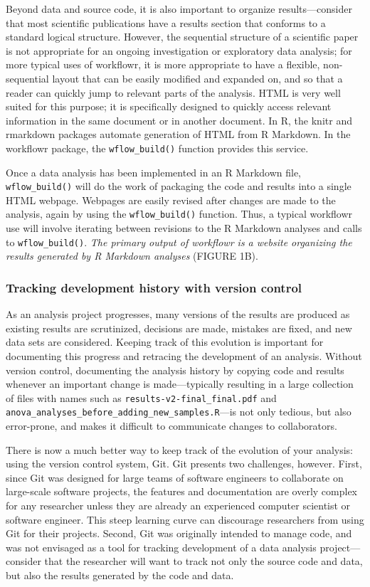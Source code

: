 \documentclass[9pt,a4paper]{extarticle}
\begin{document}
Beyond data and source code, it is also important to organize
results—consider that most scientific publications have a results
section that conforms to a standard logical structure. However, the
sequential structure of a scientific paper is not appropriate for an
ongoing investigation or exploratory data analysis; for more typical
uses of workflowr, it is more appropriate to have a flexible,
non-sequential layout that can be easily modified and expanded on, and
so that a reader can quickly jump to relevant parts of the analysis.
HTML is very well suited for this purpose; it is specifically designed
to quickly access relevant information in the same document or in
another document. In R, the knitr and rmarkdown packages automate
generation of HTML from R Markdown. In the workflowr package, the
\verb|wflow_build()| function provides this service.

Once a data analysis has been implemented in an R Markdown file,
\verb|wflow_build()| will do the work of packaging the code and results into a
single HTML webpage. Webpages are easily revised after changes are made
to the analysis, again by using the \verb|wflow_build()| function. Thus, a
typical workflowr use will involve iterating between revisions to the R
Markdown analyses and calls to \verb|wflow_build()|. \textit{The primary output
of workflowr is a website organizing the results generated by R Markdown
analyses} (FIGURE 1B).

\subsubsection*{Tracking development history with version control}

As an analysis project progresses, many versions of the results are
produced as existing results are scrutinized, decisions are made,
mistakes are fixed, and new data sets are considered. Keeping track of
this evolution is important for documenting this progress and retracing
the development of an analysis. Without version control, documenting the
analysis history by copying code and results whenever an important
change is made—typically resulting in a large collection of files with
names such as \verb|results-v2-final_final.pdf| and
\verb|anova_analyses_before_adding_new_samples.R|—is not only tedious,
but also error-prone, and makes it difficult to communicate changes to
collaborators.

There is now a much better way to keep track of the evolution of your
analysis: using the version control system, Git. Git presents two
challenges, however. First, since Git was designed for large teams of
software engineers to collaborate on large-scale software projects, the
features and documentation are overly complex for any researcher unless
they are already an experienced computer scientist or software engineer.
This steep learning curve can discourage researchers from using Git for
their projects. Second, Git was originally intended to manage code, and
was not envisaged as a tool for tracking development of a data analysis
project—consider that the researcher will want to track not only the
source code and data, but also the results generated by the code and
data.
\end{document}
